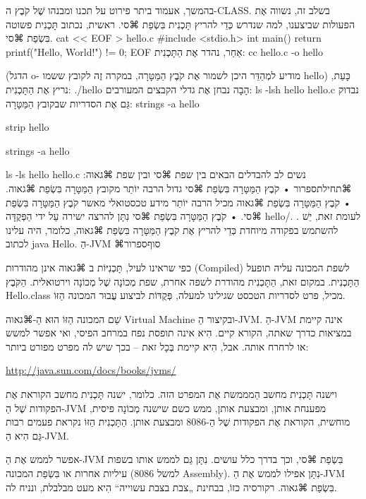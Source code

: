 בהמשך, אעמוד ביתר פירוט על תכנו ומבנהו שֶׁל קֹבֶץ ה-CLASS. בשלב זה, נשווה אֶת
הפעולות שביצענו, למה שנדרש כְּדֵי להריץ תָּכְנִית בִּשְׂפַת ⌘סי.
ראשית, נכתוב תָּכְנִית פשוטה בִּשְׂפַת ⌘סי.
cat << EOF > hello.c
#include <stdio.h>
int main() {
   return printf("Hello, World!\n") != 0;
}
EOF
\END
אַחַר, נהדר אֶת הַתָּכְנִית:
cc hello.c -o hello
\END

(הדגל o- מודיע למְהַדֵּר היכן לשמור אֶת קֹבֶץ הַמַּטָּרָה, במקרה זֶה לקובץ ששמו
hello)
כָּעֵת, נריץ אֶת הַתָּכְנִית:
./hello
\END
הָבָה נבחן אֶת גדלי הקבצים המעורבים:
ls -lsh hello hello.c
\END
נבדוק גַּם אֶת הסדריות שבקובץ הַמַּטָּרָה:
strings -a hello
\END


strip hello
\END

strings -a hello
\END

ls -ls hello hello.c
\END
נשים לב להבדלים הבאים בין שפת ⌘סי ובין שפת ⌘גאוה:
⌘תחילת{ספרור}
•  קֹבֶץ הַמַּטָּרָה בִּשְׂפַת  ⌘סי גדול הרבה יוֹתֵר מקובץ הַמַּטָּרָה בִּשְׂפַת
⌘גאוה.
•  קֹבֶץ הַמַּטָּרָה בִּשְׂפַת ⌘גאוה מכיל הרבה יוֹתֵר מידע טכסטואלי מאשר קֹבֶץ
הַמַּטָּרָה בִּשְׂפַת ⌘סי.
•  קֹבֶץ הַמַּטָּרָה בִּשְׂפַת ⌘סי נִתָּן להרצה ישירה עַל ידי הַפְּקֻדָּה hello/.
. לעומת זאת, יֵשׁ להשתמש בפקודה מיוחדת כְּדֵי להריץ אֶת קֹבֶץ הַמַּטָּרָה
בִּשְׂפַת ⌘גאוה, כלומר, היה עלינו לכתוב java Hello.
הַ-JVM
⌘סוף{ספרור}

כפי שראינו לעיל, תָּכְנִיּוֹת ב ⌘גאוה אינן מהודרות (Compiled) לשפת המכונה עליה
תופעל הַתָּכְנִית. במקום זאת, הַתָּכְנִית מהודרת לשפה אחרת, שפת מְכוֹנָה שֶׁל
מְכוֹנָה וירטואלית. הַקֹּבֶץ Hello.class מכיל, פרט לסדריות הטכסט שגילינו למעלה,
פְּקֻדּוֹת לביצוע עֲבוּר המכונה הַזּוֹ.

שֵׁם המכונה הַזּוֹ הוּא הַ-⌘גאוה Virtual Machine ובקיצור הַ-JVM. הַ-JVM אינה
קיימת במציאות כדרך שאתה, הקורא קיים. הִיא אינה תופסת נפח במרחב הפיסי, ואי אפשר
למשש או לרחרח אותה. אבל, הִיא קיימת בְּכָל זאת – בכך שיש לה מפרט מפורט ביותר:
\begin{english}
\url{http://java.sun.com/docs/books/jvms/}
\end{english}


וישנה תָּכְנִית מחשב הַמממשת אֶת המפרט הזה. כלומר, ישנה תָּכְנִית מחשב הקוראת
אֶת הפקודות שֶׁל הַ-JVM מפענחת אותן, ומבצעת אותן, ממש כשם שישנה מְכוֹנָה פיסית,
מוחשית, הקוראת אֶת הפקודות שֶׁל הַ-8086 ומבצעת אותן. הַתָּכְנִית הַזּוֹ נקראת
פעמים רבות גַּם הִיא הַ-JVM.

אפשר לממש אֶת הַ-JVM בִּשְׂפַת ⌘סי, וכך בדרך כלל עושים. נִתָּן גַּם לממש אותו
בשפות עיליות אחרות או בִּשְׂפַת המכונה (למשל 8086 Assembly). נִתָּן אפילו לממש
אֶת הַ-JVM בִּשְׂפַת ⌘גאוה. רקורסיה כזוֹ, בבחינת „צבת בצבת עשוייה“ הִיא מעט
מבלבלת, ונניח לה.

